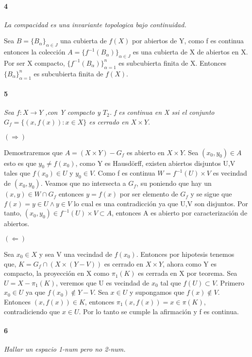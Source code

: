 \documentclass[12pt]{article}
\begin{document}
\paragraph{4}
\textit{La compacidad es una invariante topologica bajo continuidad.}

Sea $B=\{B_\alpha\}_{\alpha\in J}$ una cubierta de $f(X)$ por abiertos de Y, como f es continua entonces la colección $A=\{f^{-1}(B_\alpha)\}_{\alpha\in J}$ es una cubierta de X de abiertos en X. Por ser X compacto, $\{f^{-1}(B_\alpha)\}_{\alpha=1}^n$ es subcubierta finita de X. Entonces $\{B_\alpha\}_{\alpha=1}^n$ es subcubierta finita de $f(X)$.

\paragraph{5}
\textit{Sea $f:X\rightarrow Y$ ,con Y compacto y $T_2$. f es continua en X ssi el conjunto $G_f =\{(x,f(x)):x\in X\}$ es cerrado en $X\times Y$.}

$(\Rightarrow)$

Demostraremos que $A=(X\times Y) - G_f$ es abierto en $X\times Y$. Sea $(x_0 ,y_0)\in A$ esto es que $y_0\neq f(x_0)$, como Y es Hausdörff, existen abiertos disjuntos U,V tales que $f(x_0)\in U$ y $y_0\in V$. Como f es continua $W=f^{-1}(U)\times V$ es vecindad de $(x_0,y_0)$. Veamos que no intersecta a $G_f$, su poniendo que hay un $(x,y)\in W \cap G_f$ entonces $y=f(x)$ por ser elemento de $G_f$ y se sigue que $f(x)=y\in U \land y\in V$ lo cual es una contradicción ya que U,V son disjuntos. Por tanto, $(x_0,y_0)\in f^{-1}(U)\times V\subset A$, entonces A es abierto por caracterización de abiertos.

$(\Leftarrow)$

Sea $x_0\in X$ y sea V una vecindad de $f(x_0)$. Entonces por hipotesis tenemos que, $K=G_f \cap (X\times (Y-V))$ es cerrado en $X\times Y$, ahora como Y es compacto, la proyección en X como $\pi_1(K)$ es cerrada en X por teorema. Sea $U=X-\pi_1(K)$, veremos que U es vecindad de $x_0$ tal que $f(U)\subset V$. Primero $x_0\in U$ ya que $f(x_0)\notin Y-V$. Sea $x\in U$ y supongamos que $f(x)\notin V$. Entonces $(x,f(x))\in K$, entonces $\pi_1(x,f(x))=x\in \pi(K)$, contradiciendo que $x\in U$. Por lo tanto se cumple la afirmación y f es continua.

\paragraph{6}
\textit{Hallar un espacio 1-num pero no 2-num.}
\end{document}
